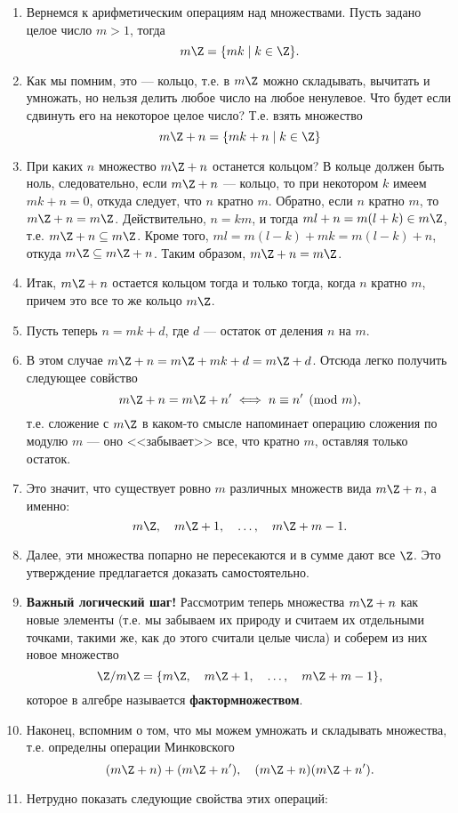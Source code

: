 \begin{enumerate}
\item Вернемся к арифметическим операциям над множествами. Пусть задано целое число $m>1$, тогда
$$
m\Z = \{mk\mid k\in \Z\}.
$$
\item Как мы помним, это --- кольцо, т.е. в $m\Z$ можно складывать, вычитать и умножать, но нельзя делить любое число на любое ненулевое. Что будет если сдвинуть его на некоторое целое число? Т.е. взять множество
$$
m\Z+n = \{mk+n\mid k\in\Z\}
$$
\item При каких $n$ множество $m\Z+n$ останется кольцом? В кольце должен быть ноль, следовательно, если $m\Z+n$ --- кольцо, то при некотором $k$ имеем $mk+n=0$, откуда следует, что $n$ кратно $m$. Обратно, если $n$ кратно $m$, то $m\Z+n=m\Z$. Действительно, $n=km$, и тогда $ml+n=m(l+k)\in m\Z$, т.е. $m\Z+n\subseteq m\Z$. Кроме того, $ml=m(l-k)+mk=m(l-k)+n$, откуда $m\Z\subseteq m\Z+n$. Таким образом, $m\Z+n=m\Z$.
\item Итак, $m\Z+n$ остается кольцом тогда и только тогда, когда $n$ кратно $m$, причем это все то же кольцо $m\Z$.
\item Пусть теперь $n=mk+d$, где $d$ --- остаток от деления $n$ на $m$.
\item В этом случае $m\Z+n=m\Z+mk+d=m\Z+d$. Отсюда легко получить следующее совйство
$$
m\Z+n = m\Z+n' \iff n\equiv n' \pmod m,
$$
т.е. сложение с $m\Z$ в каком-то смысле напоминает операцию сложения по модулю $m$ --- оно <<забывает>> все, что кратно $m$, оставляя только остаток.
\item Это значит, что существует ровно $m$ различных множеств вида $m\Z+n$, а именно:
$$
m\Z,\quad m\Z+1,\quad\dots,\quad m\Z+m-1.
$$
\item Далее, эти множества попарно не пересекаются и в сумме дают все $\Z$. Это утверждение предлагается доказать самостоятельно.
\item \textbf{Важный логический шаг!} Рассмотрим теперь множества $m\Z+n$ как новые элементы (т.е. мы забываем их природу и считаем их отдельными точками, такими же, как до этого считали целые числа) и соберем из них новое множество
$$
\Z/m\Z = \{m\Z,\quad m\Z+1,\quad\dots,\quad m\Z+m-1\},
$$
которое в алгебре называется \textbf{фактормножеством}.
\item Наконец, вспомним о том, что мы можем умножать и складывать множества, т.е. определны операции Минковского
$$
(m\Z+n)+(m\Z+n'),\quad (m\Z+n)(m\Z+n').
$$
\item Нетрудно показать следующие свойства этих операций:
\begin{enumerate}[Z1]

\end{enumerate}
\end{enumerate}

